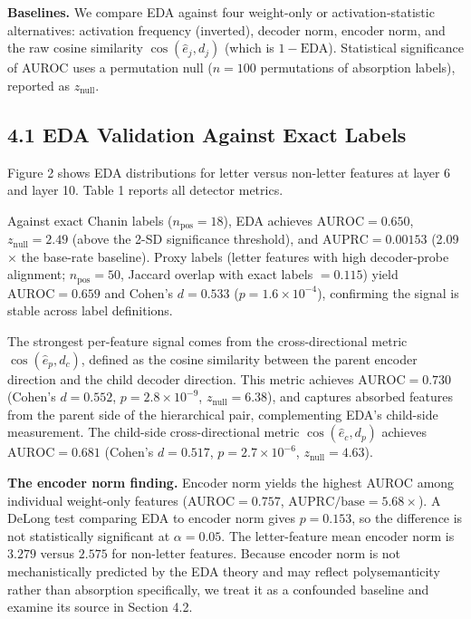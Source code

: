 \documentclass{article}
\begin{document}
\textbf{Baselines.} We compare EDA against four weight-only or activation-statistic alternatives:
activation frequency (inverted), decoder norm, encoder norm, and the raw cosine similarity
$\cos(\hat{e}_j, d_j)$ (which is $1 - \text{EDA}$).
Statistical significance of AUROC uses a permutation null ($n = 100$ permutations of
absorption labels), reported as $z_\text{null}$.

\subsection{4.1 EDA Validation Against Exact Labels}

Figure 2 shows EDA distributions for letter versus non-letter features at layer 6 and layer 10.
Table 1 reports all detector metrics.

Against exact Chanin labels ($n_\text{pos} = 18$), EDA achieves $\text{AUROC} = 0.650$,
$z_\text{null} = 2.49$ (above the 2-SD significance threshold), and
$\text{AUPRC} = 0.00153$ (2.09$\times$ the base-rate baseline).
Proxy labels (letter features with high decoder-probe alignment; $n_\text{pos} = 50$,
Jaccard overlap with exact labels $= 0.115$) yield $\text{AUROC} = 0.659$ and
Cohen's $d = 0.533$ ($p = 1.6 \times 10^{-4}$), confirming the signal is stable across
label definitions.

The strongest per-feature signal comes from the cross-directional metric
$\cos(\hat{e}_p, d_c)$, defined as the cosine similarity between the parent encoder
direction and the child decoder direction.
This metric achieves $\text{AUROC} = 0.730$ (Cohen's $d = 0.552$, $p = 2.8 \times 10^{-9}$,
$z_\text{null} = 6.38$), and captures absorbed features from the parent side of the
hierarchical pair, complementing EDA's child-side measurement.
The child-side cross-directional metric $\cos(\hat{e}_c, d_p)$ achieves
$\text{AUROC} = 0.681$ (Cohen's $d = 0.517$, $p = 2.7 \times 10^{-6}$, $z_\text{null} = 4.63$).

\textbf{The encoder norm finding.} Encoder norm yields the highest AUROC among individual
weight-only features ($\text{AUROC} = 0.757$, $\text{AUPRC}/\text{base} = 5.68\times$).
A DeLong test comparing EDA to encoder norm gives $p = 0.153$, so the difference is not
statistically significant at $\alpha = 0.05$.
The letter-feature mean encoder norm is $3.279$ versus $2.575$ for non-letter features.
Because encoder norm is not mechanistically predicted by the EDA theory and may reflect
polysemanticity rather than absorption specifically, we treat it as a confounded baseline
and examine its source in Section 4.2.
\end{document}
